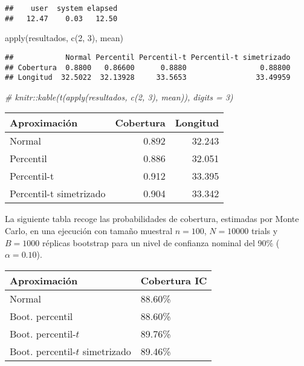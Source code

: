 \documentclass[
]{book}
\newenvironment{Shaded}{\begin{snugshade}}{\end{snugshade}}
\newcommand{\CommentTok}[1]{\textcolor[rgb]{0.56,0.35,0.01}{\textit{#1}}}
\newcommand{\DecValTok}[1]{\textcolor[rgb]{0.00,0.00,0.81}{#1}}
\newcommand{\FunctionTok}[1]{\textcolor[rgb]{0.00,0.00,0.00}{#1}}
\newcommand{\NormalTok}[1]{#1}
\theoremstyle{break}
\theoremstyle{definition}
\theoremstyle{definition}
\theoremstyle{definition}
\theoremstyle{definition}
\theoremstyle{remark}
\begin{document}
\begin{verbatim}
##    user  system elapsed 
##   12.47    0.03   12.50
\end{verbatim}

\begin{Shaded}
\begin{Highlighting}[]
\FunctionTok{apply}\NormalTok{(resultados, }\FunctionTok{c}\NormalTok{(}\DecValTok{2}\NormalTok{, }\DecValTok{3}\NormalTok{), mean)}
\end{Highlighting}
\end{Shaded}

\begin{verbatim}
##            Normal Percentil Percentil-t Percentil-t simetrizado
## Cobertura  0.8800   0.86600      0.8880                 0.88800
## Longitud  32.5022  32.13928     33.5653                33.49959
\end{verbatim}

\begin{Shaded}
\begin{Highlighting}[]
\CommentTok{\# knitr::kable(t(apply(resultados, c(2, 3), mean)), digits = 3)}
\end{Highlighting}
\end{Shaded}

\begin{longtable}[]{@{}lrr@{}}
\toprule
Aproximación & Cobertura & Longitud \\
\midrule
\endhead
Normal & 0.892 & 32.243 \\
Percentil & 0.886 & 32.051 \\
Percentil-t & 0.912 & 33.395 \\
Percentil-t simetrizado & 0.904 & 33.342 \\
\bottomrule
\end{longtable}

La siguiente tabla recoge las probabilidades de cobertura, estimadas por
Monte Carlo, en una ejecución con tamaño muestral \(n=100\), \(N=10000\)
trials y \(B=1000\) réplicas bootstrap para un nivel de confianza nominal
del 90\% (\(\alpha =0.10\)).

\begin{longtable}[]{@{}ll@{}}
\toprule
Aproximación & Cobertura IC \\
\midrule
\endhead
Normal & 88.60\% \\
Boot. percentil & 88.60\% \\
Boot. percentil-\(t\) & 89.76\% \\
Boot. percentil-\(t\) simetrizado & 89.46\% \\
\bottomrule
\end{longtable}
\end{document}
